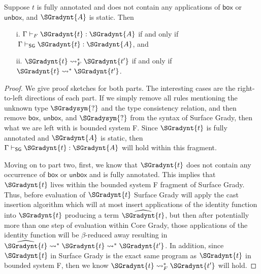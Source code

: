 \begin{lemma}
  \label{lemma:F-inclusion}
  Suppose $t$ is fully annotated and does not contain any applications
  of $ \mathsf{box} $ or $ \mathsf{unbox} $, and $\SGradynt{A}$ is static.  Then
  \begin{itemize}
  \item[i.] $ \Gamma  \vdash_F  \SGradynt{t}  :  \SGradynt{A} $ if and only if $\, \Gamma  \vdash_{\mathsf{SG} }  \SGradynt{t}  :  \SGradynt{A} $, and 
  \item[ii.] $ \SGradynt{t}  \rightsquigarrow^*_F  \SGradynt{t'} $ if and only if $ \SGradynt{t}  \rightsquigarrow^*  \SGradynt{t'} $.
  \end{itemize}
\end{lemma}
\begin{proof}
  We give proof sketches for both parts.  The interesting cases are
  the right-to-left directions of each part.  If we simply remove all
  rules mentioning the unknown type $\SGradysym{\mbox{?}}$ and the type consistency
  relation, and then remove $ \mathsf{box} $, $ \mathsf{unbox} $, and $\SGradysym{\mbox{?}}$ from
  the syntax of Surface Grady, then what we are left with is bounded
  system F.  Since $\SGradynt{t}$ is fully annotated and $\SGradynt{A}$ is static,
  then $ \Gamma  \vdash_{\mathsf{SG} }  \SGradynt{t}  :  \SGradynt{A} $ will hold within this fragment.

  Moving on to part two, first, we know that $\SGradynt{t}$ does not contain
  any occurrence of $ \mathsf{box} $ or $ \mathsf{unbox} $ and is fully annotated.
  This implies that $\SGradynt{t}$ lives within the bounded system F fragment
  of Surface Grady. Thus, before evaluation of $\SGradynt{t}$ Surface Grady
  will apply the cast insertion algorithm which will at most insert
  applications of the identity function into $\SGradynt{t}$ producing a term
  $\widehat{\SGradynt{t}}$, but then after potentially more than one step of
  evaluation within Core Grady, those applications of the identity
  function will be $\beta$-reduced away resulting in $\widehat{\SGradynt{t}}
  \rightsquigarrow^* \SGradynt{t} \rightsquigarrow^* \SGradynt{t'}$.  In addition,
  since $\SGradynt{t}$ in Surface Grady is the exact same program as $\SGradynt{t}$
  in bounded system F, then we know $ \SGradynt{t}  \rightsquigarrow^*_F  \SGradynt{t'} $ will hold.
\end{proof}

